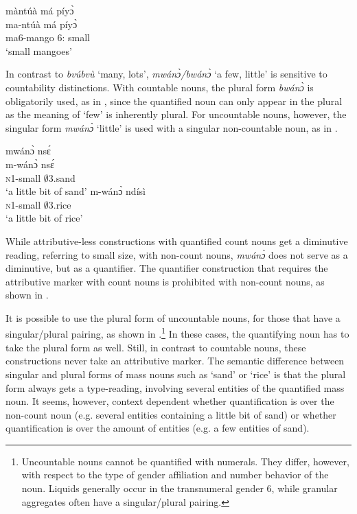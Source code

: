 \ea\label{mango}
  \glll     màntúà má píyɔ̀ \\
  ma-ntúà má píyɔ̀ \\
                ma6-mango 6:{\ATT} small \\
    \trans `small mangoes'
\z

In contrast to {\itshape bvúbvù} `many, lots', {\itshape mwánɔ̀/bwánɔ̀} `a few, little' is sensitive to countability distinctions. With countable nouns, the plural form {\itshape bwánɔ̀} is obligatorily used, as in , since the quantified noun can only appear in the plural as the meaning of `few' is inherently plural. For uncountable nouns, however, the singular form {\itshape mwánɔ̀} `little' is used with a singular non-countable noun, as in . 

\ea\label{little}
\ea \label{little1}
  \glll mwánɔ̀ nsɛ́ \\
    m-wánɔ̀ nsɛ́ \\
    \textsc{n}1-small $\emptyset$3.sand\\
    \trans `a little bit of sand'
\ex\label{little2}
 \gll     m-wánɔ̀ ndísì  \\
             \textsc{n}1-small $\emptyset$3.rice  \\
    \trans `a little bit of rice'
\z
\z

While attributive-less constructions with quantified count nouns get a diminutive reading, referring to small size, with non-count nouns, {\itshape mwánɔ̀} does not serve as a diminutive, but as a quantifier. The quantifier construction that requires the attributive marker with count nouns is prohibited with non-count nouns, as shown in . 


It is possible to use the plural form of uncountable nouns, for those that have a singular/plural pairing, as shown in .\footnote{Uncountable nouns cannot be quantified with numerals. They differ, however, with respect to the type of gender affiliation and number behavior of the noun. Liquids generally occur in the transnumeral gender 6, while granular aggregates often have a singular/plural pairing.} In these cases, the quantifying noun has to take the plural form as well. Still, in contrast to countable nouns, these constructions never take an attributive marker. The semantic difference between singular and plural forms of mass nouns such as `sand' or `rice' is that the plural form always gets a type-reading, involving several entities of the quantified mass noun. It seems, however, context dependent whether quantification is over the non-count noun (e.g. several entities containing a little bit of sand) or whether quantification is over the amount of entities (e.g. a few entities of sand).

